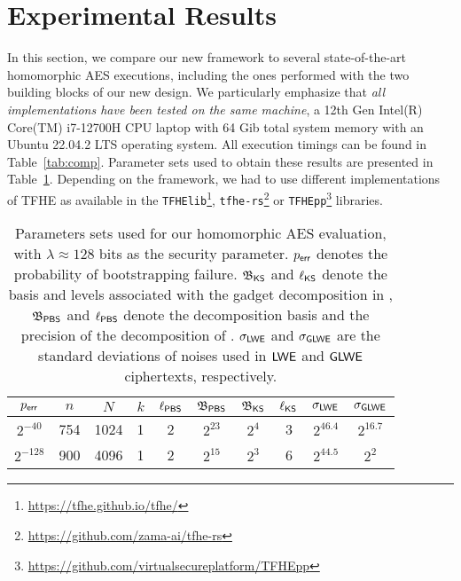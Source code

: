\section{Experimental Results}
\label{sec:comparison}

In this section, we compare our new framework to several state-of-the-art homomorphic AES executions, including the ones performed with the two building blocks of our new design.
We particularly emphasize that \textit{all implementations have been tested on the same machine}, a 12th Gen Intel(R) Core(TM) i7-12700H CPU laptop with 64 Gib total system memory with an Ubuntu 22.04.2 LTS operating system. All execution timings can be found in Table~\ref{tab:comp}.
Parameter sets used to obtain these results are presented in Table~\ref{tab:params}.
Depending on the framework, we had to use different implementations of TFHE as available in the \texttt{TFHElib}\footnote{\url{https://tfhe.github.io/tfhe/}}, \texttt{tfhe-rs}\footnote{\url{https://github.com/zama-ai/tfhe-rs}} or \texttt{TFHEpp}\footnote{\url{https://github.com/virtualsecureplatform/TFHEpp}} libraries.


\begin{table}[htbp]
\caption{Parameters sets used for our homomorphic AES evaluation, with $\lambda\approx128$ bits as the security parameter. $p_{\textsf{err}}$ denotes the probability of bootstrapping failure. $\mathfrak{B}_{\textsf{KS}}$ and $\ell_{\textsf{KS}}$ denote the basis and levels associated with the gadget decomposition in \KeySwitch, $\mathfrak{B}_{\textsf{PBS}}$ and $\ell_{\textsf{PBS}}$ denote the decomposition basis and the precision of the decomposition of \BlindRotate. $\sigma_{\textsf{LWE}}$ and $\sigma_{\textsf{GLWE}}$ are the standard deviations of noises used in $\textsf{LWE}$ and $\textsf{GLWE}$ ciphertexts, respectively.}
\label{tab:params}
\begin{adjustbox}{center}
\begin{tabular}{|c||c|c|c|c|c|c|c|c|c|}
\hline
 $p_{\textsf{err}}$ &  $n$   & $N$ & $k$   & $\ell_{\textsf{PBS}}$ & $\mathfrak{B}_{\textsf{PBS}}$ & $\mathfrak{B}_{\textsf{KS}}$ & $\ell_{\textsf{KS}}$ & $\sigma_{\textsf{LWE}}$ & $\sigma_{\textsf{GLWE}}$ \\ \hline
  $2^{-40}$ & 754     &    1024  & 1  &  2   &    $2^{23}$   &   $2^4$     &   3  &  $2^{46.4}$       &    $2^{16.7}$       \\ \hline  
    $2^{-128}$ &   900    &   4096   & 1  &   2  &   $2^{15}$   &    $2^3$    &  6 &    $2^{44.5}$      &    $2^2$      \\ \hline  
\end{tabular}
\end{adjustbox}
\end{table}

